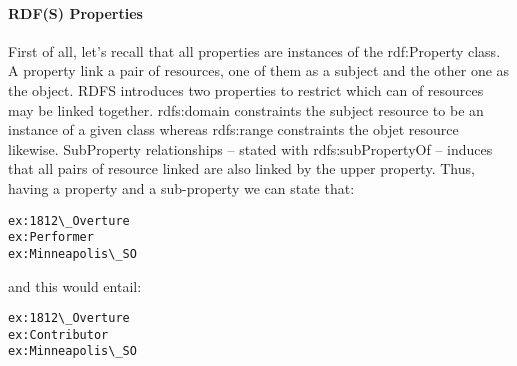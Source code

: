 \paragraph{RDF(S) Properties}
First of all, let's recall that all properties are instances of the rdf:Property class. A property link a pair of resources, one of them as a subject and the other one as the object. 
RDFS introduces two properties to restrict which can of resources may be linked together. rdfs:domain constraints the subject resource to be an instance of a given class whereas rdfs:range constraints the objet resource likewise. 
SubProperty relationships – stated with rdfs:subPropertyOf – induces that all pairs of resource linked are also linked by the upper property. 
Thus, having a  property and a  sub-property we can state that:
\begin{Verbatim}[fontsize=\small,formatcom=\color{black!70}]
ex:1812\_Overture
ex:Performer
ex:Minneapolis\_SO
\end{Verbatim}
and this would entail:
\begin{Verbatim}[fontsize=\small,formatcom=\color{black!70}]
ex:1812\_Overture
ex:Contributor
ex:Minneapolis\_SO
\end{Verbatim}

